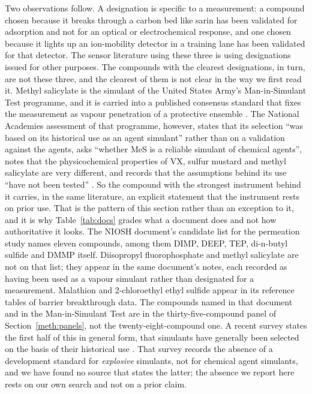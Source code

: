 \documentclass[1p,times]{elsarticle}
\begin{document}
Two observations follow. A designation is specific to a measurement: a compound
chosen because it breaks through a carbon bed like sarin has been validated for
adsorption and not for an optical or electrochemical response, and one chosen
because it lights up an ion-mobility detector in a training lane has been
validated for that detector. The sensor literature using these three is using
designations issued for other
purposes. The compounds with the clearest designations, in turn, are not these
three, and the clearest of them is not clear in the way we first read it.
Methyl salicylate is the simulant of the United States Army's Man-in-Simulant
Test programme, and it is carried into a published consensus standard that fixes
the measurement as vapour penetration of a protective ensemble
\cite{astmf2588}. The National Academies assessment of that programme, however,
states that its selection ``was based on its historical use as an agent
simulant'' rather than on a validation against the agents, asks ``whether MeS is
a reliable simulant of chemical agents'', notes that the physicochemical
properties of VX, sulfur mustard and methyl salicylate are very different, and
records that the assumptions behind its use ``have not been tested''
\cite{nrc1997mist}. So the compound with the strongest instrument behind it
carries, in the same literature, an explicit statement that the instrument rests
on prior use. That is the pattern of this section rather than an exception to
it, and it is why Table~\ref{tab:docs} grades what a document does and not how
authoritative it looks. The NIOSH document's candidate list for the permeation study
names eleven compounds, among them DIMP, DEEP, TEP, di-n-butyl sulfide and DMMP
itself. Diisopropyl fluorophosphate and methyl salicylate are not on that list;
they appear in the same document's notes, each recorded as having been used as a
vapour simulant rather than designated for a measurement. Malathion and
2-chloroethyl ethyl sulfide appear in its reference tables of barrier
breakthrough data. The compounds named in that document and in the
Man-in-Simulant Test are in the thirty-five-compound panel of
Section~\ref{meth:panels}, not the twenty-eight-compound one. A recent
survey states the first half of this in general form, that simulants have
generally been selected on the basis of their historical use
\cite{lawrence2025simulants}. That survey records the absence of a development
standard for \emph{explosive} simulants, not for chemical agent simulants, and
we have found no source that states the latter; the absence we report here rests
on our own search and not on a prior claim.
\end{document}
